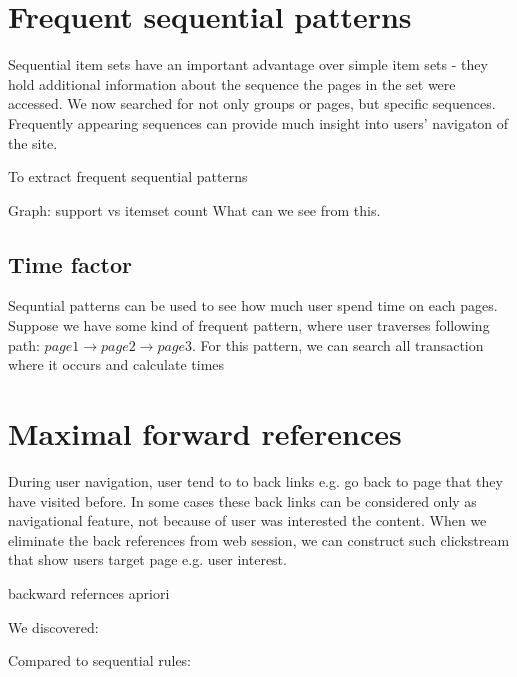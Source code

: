 \documentclass[english,a4paper]{article}
\begin{document}
\section{Frequent sequential patterns}

Sequential item sets have an important advantage over simple item sets - they hold additional information about the sequence the pages in the set were accessed. We now searched for not only groups or pages, but specific sequences. Frequently appearing sequences can provide much insight into users' navigaton of the site.

To extract frequent sequential patterns

Graph: support vs itemset count
What can we see from this.





\subsection{Time factor}
Sequntial patterns can be used to see how much user spend time on each pages. Suppose we have some kind of frequent pattern, where user traverses following path: $page1 \rightarrow page2 \rightarrow page3$. For this pattern, we can search all transaction where it occurs and calculate times













\section{Maximal forward references}

During user navigation, user tend to to back links e.g. go back to page that they have visited before. In some cases these back links can be considered only as navigational feature, not because of user was interested the content.  When we eliminate the back references from web session, we can construct such clickstream that show users target page e.g. user interest.

backward refernces
apriori

We discovered:

Compared to sequential rules:
\end{document}
